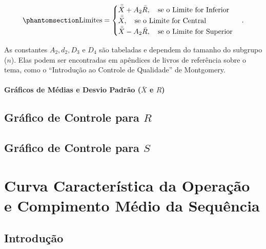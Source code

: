 \documentclass[
  portuguese,
  11pt,
  a4paper,
  DIV=11,
  numbers=noendperiod]{scrreprt}
\begin{document}
\begin{equation}\phantomsection\label{eq-DEF_LIMITS_R_CHARTS}{
\text{Limites} = \begin{cases} \bar{\bar{X}} + A_2 \bar{R}, \quad \text{se o Limite for Inferior} \\ \bar{\bar{X}}, \quad \text{se o Limite for Central} \\ \bar{\bar{X}} - A_2 \bar{R}, \quad \text{se o Limite for Superior} \end{cases}.
}\end{equation}

As constantes \(A_2, d_2, D_3\) e \(D_4\) são tabeladas e dependem do
tamanho do subgrupo (\(n\)). Elas podem ser encontradas em apêndices de
livros de referência sobre o tema, como o ``Introdução ao Controle de
Qualidade'' de Montgomery.

\subsubsection{\texorpdfstring{Gráficos de Médias e Desvio Padrão
(\(\bar{X}\) e
\(R\))}{Gráficos de Médias e Desvio Padrão (\textbackslash bar\{X\} e R)}}\label{gruxe1ficos-de-muxe9dias-e-desvio-padruxe3o-barx-e-r}

\section{\texorpdfstring{Gráfico de Controle para
\(R\)}{Gráfico de Controle para R}}\label{gruxe1fico-de-controle-para-r}

\section{\texorpdfstring{Gráfico de Controle para
\(S\)}{Gráfico de Controle para S}}\label{gruxe1fico-de-controle-para-s}


\chapter{Curva Característica da Operação e Compimento Médio da
Sequência}\label{curva-caracteruxedstica-da-operauxe7uxe3o-e-compimento-muxe9dio-da-sequuxeancia}

\section{Introdução}\label{introduuxe7uxe3o-1}
\end{document}
